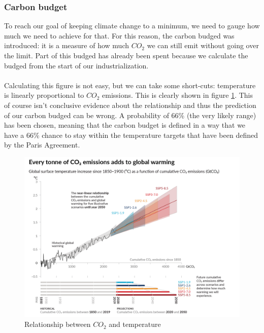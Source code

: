 \documentclass[../summary.tex]{subfiles}
\begin{document}
			\subsubsection{Carbon budget}
				To reach our goal of keeping climate change to a minimum, we need to gauge how much we need to achieve for that. For this reason, the carbon budged was introduced: it is a measure of how much $CO_2$ we can still emit without going over the limit. Part of this budged has already been spent because we calculate the budged from the start of our industrialization. \\
				\\
				Calculating this figure is not easy, but we can take some short-cuts: temperature is linearly proportional to $CO_2$ emissions. This is clearly shown in figure \ref{fig:1-co2-temp}. This of course isn't conclusive evidence about the relationship and thus the prediction of our carbon budged can be wrong. A probability of 66\% (the very likely range) has been chosen, meaning that the carbon budget is defined in a way that we have a 66\% chance to stay within the temperature targets that have been defined by the Paris Agreement.
				\begin{figure}[h]
					\centering
					\includegraphics[width=0.7\linewidth]{../images/1-co2-temp.png}
					\caption{Relationship between $CO_2$ and temperature}
					\label{fig:1-co2-temp}
				\end{figure}
				
\end{document}
